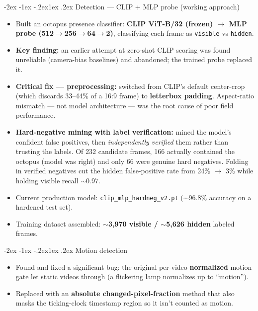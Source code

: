 \documentclass[11pt]{article}
\makeatletter
\renewcommand{\subsection}{\@startsection{subsection}{2}{\z@}%
  {-2ex \@plus -1ex \@minus -.2ex}{1ex \@plus.2ex}%
  {\normalfont\normalsize\bfseries}}
\newcommand{\code}[1]{\texttt{\small #1}}
\makeatother
\begin{document}
\subsection{Detection --- CLIP + MLP probe (working approach)}
\begin{itemize}
  \item Built an octopus presence classifier: \textbf{CLIP ViT-B/32 (frozen) $\rightarrow$ MLP probe (512$\to$256$\to$64$\to$2)}, classifying each frame as \code{visible} vs \code{hidden}.
  \item \textbf{Key finding:} an earlier attempt at zero-shot CLIP scoring was found unreliable (camera-bias baselines) and abandoned; the trained probe replaced it.
  \item \textbf{Critical fix --- preprocessing:} switched from CLIP's default center-crop (which discards 33--44\% of a 16:9 frame) to \textbf{letterbox padding}. Aspect-ratio mismatch --- not model architecture --- was the root cause of poor field performance.
  \item \textbf{Hard-negative mining with label verification:} mined the model's confident false positives, then \emph{independently verified} them rather than trusting the labels. Of 232 candidate frames, 166 actually contained the octopus (model was right) and only 66 were genuine hard negatives. Folding in verified negatives cut the hidden false-positive rate from 24\% $\rightarrow$ 3\% while holding visible recall $\sim$0.97.
  \item Current production model: \code{clip\_mlp\_hardneg\_v2.pt} ($\sim$96.8\% accuracy on a hardened test set).
  \item Training dataset assembled: \textbf{$\sim$3{,}970 visible / $\sim$5{,}626 hidden} labeled frames.
\end{itemize}

\subsection{Motion detection}
\begin{itemize}
  \item Found and fixed a significant bug: the original per-video \textbf{normalized} motion gate let static videos through (a flickering lamp normalizes up to ``motion'').
  \item Replaced with an \textbf{absolute changed-pixel-fraction} method that also masks the ticking-clock timestamp region so it isn't counted as motion.
\end{itemize}
\end{document}
